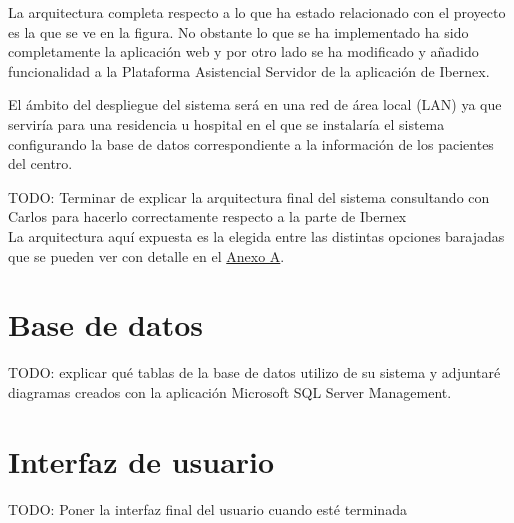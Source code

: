 La arquitectura completa respecto a lo que ha estado relacionado con el proyecto es la que se ve en la figura. No obstante lo que se ha implementado ha sido completamente la aplicación web y por otro lado se ha modificado y añadido funcionalidad a la Plataforma Asistencial Servidor de la aplicación de Ibernex. \newline

El ámbito del despliegue del sistema será en una red de área local (LAN) ya que serviría para una residencia u hospital en el que se instalaría el sistema configurando la base de datos correspondiente a la información de los pacientes del centro. \newline


TODO: Terminar de explicar la arquitectura final del sistema consultando con Carlos para hacerlo correctamente respecto a la parte de Ibernex\\



La arquitectura aquí expuesta es la elegida entre las distintas opciones barajadas que se pueden ver con detalle en el \hyperref[anexo-a]{Anexo A}.


\section{Base de datos}


TODO: explicar qué tablas de la base de datos utilizo de su sistema y adjuntaré  diagramas creados con la aplicación Microsoft SQL Server Management. \\



\section{Interfaz de usuario}


TODO: Poner la interfaz final del usuario cuando esté terminada

